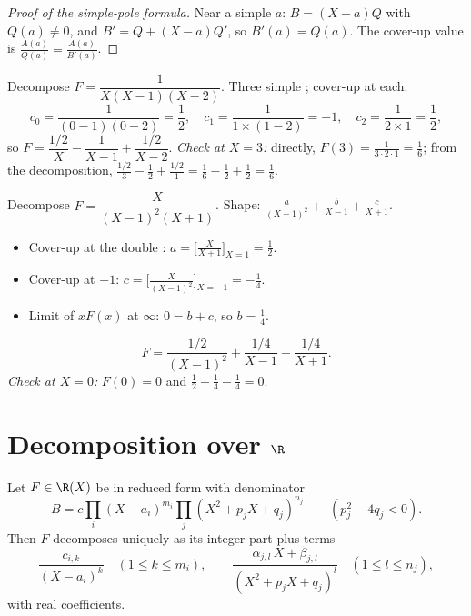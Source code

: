 \begin{proof}[Proof of the simple-pole formula]
Near a simple  $a$: $B = (X - a) Q$ with $Q(a) \neq 0$, and $B' =
Q + (X - a) Q'$, so $B'(a) = Q(a)$. The cover-up value is
$\frac{A(a)}{Q(a)} = \frac{A(a)}{B'(a)}$.
\end{proof}

\begin{example}\label{ex:b1:fractions:simple}
Decompose $F = \dfrac{1}{X(X-1)(X-2)}$. Three simple ; cover-up
at each:
\[
c_0 = \frac{1}{(0-1)(0-2)} = \frac12,
\quad
c_1 = \frac{1}{1 \times (1 - 2)} = -1,
\quad
c_2 = \frac{1}{2 \times 1} = \frac12,
\]
so $F = \dfrac{1/2}{X} - \dfrac{1}{X-1} + \dfrac{1/2}{X-2}$.
\emph{Check at $X = 3$:} directly, $F(3) = \frac{1}{3\cdot2\cdot1} =
\frac16$; from the decomposition, $\frac{1/2}{3} - \frac{1}{2} +
\frac{1/2}{1} = \frac16 - \frac12 + \frac12 = \frac16$.
\end{example}

\begin{example}\label{ex:b1:fractions:multiple}
Decompose $F = \dfrac{X}{(X-1)^2 (X+1)}$. Shape:
$\frac{a}{(X-1)^2} + \frac{b}{X-1} + \frac{c}{X+1}$.
\begin{itemize}
  \item Cover-up at the double : $a = \bigl[\frac{X}{X+1}\bigr]_{X=1}
        = \frac12$.
  \item Cover-up at $-1$: $c = \bigl[\frac{X}{(X-1)^2}\bigr]_{X=-1} =
        -\frac14$.
  \item Limit of $xF(x)$ at $\infty$: $0 = b + c$, so $b = \frac14$.
\end{itemize}
\[
F = \frac{1/2}{(X-1)^2} + \frac{1/4}{X-1} - \frac{1/4}{X+1} .
\]
\emph{Check at $X = 0$:} $F(0) = 0$ and $\frac12 - \frac14 - \frac14
= 0$.
\end{example}

\section{Decomposition over $\R$}

\begin{theorem}\label{thm:b1:fractions:real}
Let $F \in \R(X)$ be in reduced form with denominator
\[
B = c \prod_i (X - a_i)^{m_i} \prod_j (X^2 + p_j X + q_j)^{n_j}
\qquad (p_j^2 - 4q_j < 0).
\]
Then $F$ decomposes uniquely as its integer part plus terms
\[
\frac{c_{i,k}}{(X - a_i)^k} \quad (1 \leq k \leq m_i),
\qquad
\frac{\alpha_{j,l}\, X + \beta_{j,l}}{(X^2 + p_j X + q_j)^{l}}
\quad (1 \leq l \leq n_j),
\]
with real coefficients.
\end{theorem}


